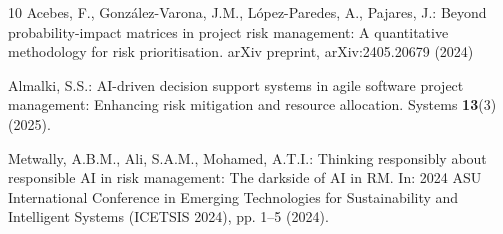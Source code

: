 \documentclass[runningheads]{llncs}
\begin{document}
\begin{thebibliography}{10}
Acebes, F., Gonz\'{a}lez-Varona, J.M., L\'{o}pez-Paredes, A., Pajares, J.: Beyond probability-impact matrices in project risk management: A quantitative methodology for risk prioritisation. arXiv preprint, arXiv:2405.20679 (2024)

Almalki, S.S.: {AI}-driven decision support systems in agile software project management: Enhancing risk mitigation and resource allocation. Systems \textbf{13}(3) (2025). 

Metwally, A.B.M., Ali, S.A.M., Mohamed, A.T.I.: Thinking responsibly about responsible {AI} in risk management: The darkside of {AI} in {RM}. In: 2024 ASU International Conference in Emerging Technologies for Sustainability and Intelligent Systems (ICETSIS 2024), pp. 1--5 (2024). 

\end{thebibliography}
\end{document}
